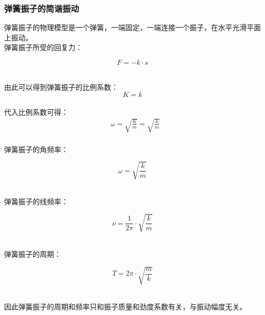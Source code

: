 \documentclass[UTF8]{ctexart}
\begin{document}
\subsubsection{弹簧振子的简谐振动}
    弹簧振子的物理模型是一个弹簧，一端固定，一端连接一个振子，在水平光滑平面上振动。\\[3mm]
    弹簧振子所受的回复力：
    \setcounter{equation}{0}
    \begin{large}
        \begin{equation*}
            F=-k\cdot s
        \end{equation*}
    \end{large}\\
    由此可以得到弹簧振子的比例系数：
    \begin{equation}
        K=k
    \end{equation}\\
    代入比例系数可得：
    \begin{align}
        &\omega=\sqrt{\frac{K}{m}}=\sqrt{\frac{k}{m}}
    \end{align}\\
    弹簧振子的角频率：
    \begin{large}
        \begin{equation*}
            \omega=\sqrt{\frac{k}{m}}
        \end{equation*}
    \end{large}\\
    弹簧振子的线频率：
    \begin{large}
        \begin{equation*}
            \nu=\frac{1}{2\pi}\cdot\sqrt{\frac{k}{m}}
        \end{equation*}
    \end{large}\\
    弹簧振子的周期：
    \begin{large}
        \begin{equation*}
            T=2\pi\cdot\sqrt{\frac{m}{k}}
        \end{equation*}
    \end{large}\\
    因此弹簧振子的周期和频率只和振子质量和劲度系数有关，与振动幅度无关。

\newpage
\end{document}

